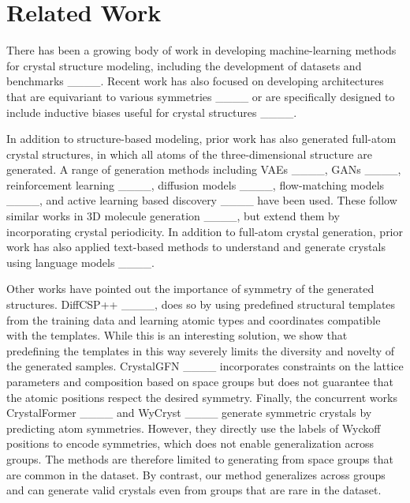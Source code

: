 \section{Related Work}
There has been a growing body of work in developing machine-learning methods for crystal structure modeling, including the development of datasets and benchmarks ____. Recent work has also focused on developing
architectures that are equivariant to various symmetries ____ or are specifically designed to include inductive biases useful for crystal structures ____.

In addition to structure-based modeling, prior work has also generated full-atom crystal structures, in which all atoms of the three-dimensional structure are generated.
A range of generation methods including VAEs ____, GANs ____, reinforcement learning ____, diffusion models ____, flow-matching models ____, and active learning based discovery ____ have been used.
 These follow similar works in 3D molecule generation ____, but extend them by incorporating crystal periodicity.
In addition to full-atom crystal generation, prior work has also applied text-based methods to understand and generate crystals using language models ____.

Other works have pointed out the importance of symmetry of the generated structures. DiffCSP++ ____, does so by using predefined structural templates from the training data and learning atomic types and coordinates compatible with the templates. While this is an interesting solution, we show that predefining the templates in this way severely limits the diversity and novelty of the generated samples. CrystalGFN ____ incorporates constraints on the lattice parameters and composition based on space groups but does not guarantee that the atomic positions respect the desired symmetry. Finally, the concurrent works CrystalFormer ____ and WyCryst 
____  generate symmetric crystals by predicting atom symmetries. However, they directly use the labels of Wyckoff positions to encode symmetries, which does not enable generalization across groups. The methods are therefore limited to generating from space groups that are common in the dataset. By contrast, our method generalizes across groups and can generate valid crystals even from groups that are rare in the dataset.